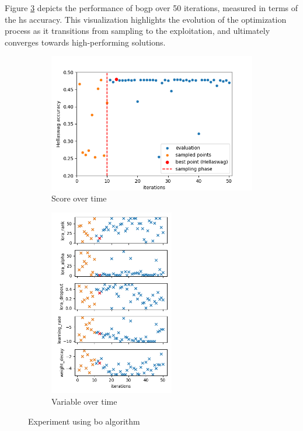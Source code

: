 Figure \ref{fig:bo_res} depicts the performance of \acrfull{bogp} over 50 iterations, measured in terms of the \Gls{hs} accuracy. This visualization highlights the evolution of the optimization process as it transitions from sampling to the exploitation, and ultimately converges towards high-performing solutions.


\begin{figure}[h!]
    \centering
    \begin{subfigure}[b]{.50\textwidth}
      \centering
      \includegraphics[width = \textwidth]{assets/img/chap_4/experiments/plots/bo/score_evolution.png}
      \caption{Score over time}
      \label{fig:bo_score_time}
    \end{subfigure}%
    \begin{subfigure}[b]{.40\textwidth}
      \centering
      \includegraphics[width = 0.6\textwidth]{assets/img/chap_4/experiments/plots/bo/variables_evolution.png}
      \caption{Variable over time}
      \label{fig:bo_var_time}
    \end{subfigure}
    \caption{Experiment using \acrshort{bo} algorithm}
    \label{fig:bo_res}
\end{figure}

